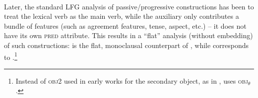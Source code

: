 \documentclass[output=paper]{../langscibook}
\begin{document}
\z
\ea\label{ex:kaplanbresnan82:70}
\\\hspace*{\fill} \citep[(70)]{kaplanbresnan82}
\z
%
Later, the standard LFG analysis of passive/progressive constructions has
been to treat the lexical verb as the main verb, while the auxiliary
only contributes a bundle of features (such as agreement features,
tense, aspect, etc.) – it does not have its own \textsc{pred}
attribute. This results in a ``flat'' analysis (without embedding) of such
constructions:  is the flat, monoclausal
counterpart of , while
 corresponds to
.\footnote{Instead of \textsc{obj2} used
  in early works for the secondary object, as in
  , 
  uses \textsc{obj$_{\theta}$}.}
\end{document}

